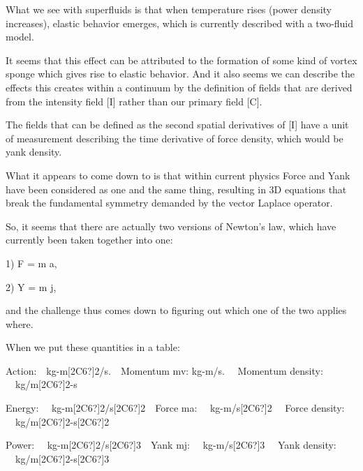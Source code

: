 \documentclass[a4paper]{article}
\newcommand\textstyleNone[1]{#1}
\begin{document}
{\color[rgb]{0.101960786,0.101960786,0.101960786}
\textstyleNone{What we see with superfluids is that when temperature rises (power density increases), elastic behavior
emerges, which is currently described with a two-fluid model.}}

{\color[rgb]{0.101960786,0.101960786,0.101960786}
\textstyleNone{It seems that this effect can be attributed to the formation of some kind of vortex sponge which gives
rise to elastic behavior. And it also seems we can describe the effects this creates within a continuum by the
definition of fields that are derived from the intensity field [I] rather than our primary field [C].}}

{\color[rgb]{0.101960786,0.101960786,0.101960786}
\textstyleNone{The fields that can be defined as the second spatial derivatives of [I] have a unit of measurement
describing the time derivative of force density, which would be yank density.}}

{\color[rgb]{0.101960786,0.101960786,0.101960786}
\textstyleNone{What it appears to come down to is that within current physics Force and Yank have been considered as one
and the same thing, resulting in 3D equations that break the fundamental symmetry demanded by the vector Laplace
operator.}}

{\color[rgb]{0.101960786,0.101960786,0.101960786}
\textstyleNone{So, it seems that there are actually two versions of Newton's law, which have currently been taken
together into one:}}

{\color[rgb]{0.101960786,0.101960786,0.101960786}
\textstyleNone{1) F = m a,}}

{\color[rgb]{0.101960786,0.101960786,0.101960786}
\textstyleNone{2) Y = m j,}}

{\color[rgb]{0.101960786,0.101960786,0.101960786}
\textstyleNone{and the challenge thus comes down to figuring out which one of the two applies where.}}

{\color[rgb]{0.101960786,0.101960786,0.101960786}
\textstyleNone{When we put these quantities in a table:}}

{\color[rgb]{0.101960786,0.101960786,0.101960786}
\textstyleNone{Action:\ \ kg-m[2C6?]2/s.\ \ Momentum mv: kg-m/s.  \ \ Momentum density: \ \ kg/m[2C6?]2-s }}

{\color[rgb]{0.101960786,0.101960786,0.101960786}
\textstyleNone{Energy: \ \ kg-m[2C6?]2/s[2C6?]2\ \ Force  ma: \ \   kg-m/s[2C6?]2  \ \ Force density: 
\ \ kg/m[2C6?]2-s[2C6?]2\ \ }}

{\color[rgb]{0.101960786,0.101960786,0.101960786}
\textstyleNone{Power:  \ \ kg-m[2C6?]2/s[2C6?]3\ \ Yank  mj: \ \   kg-m/s[2C6?]3  \ \ Yank density: 
\ \ kg/m[2C6?]2-s[2C6?]3}}
\end{document}
